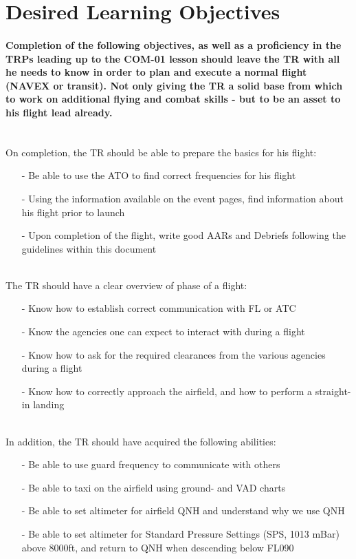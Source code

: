 \section*{Desired Learning Objectives}
 	\paragraph{
    		Completion of the following objectives, as well as a proficiency in the TRPs leading up to the COM-01 lesson should leave the TR with all he needs to know in order to plan and execute a normal flight (NAVEX or transit). Not only giving the TR a solid base from which to work on additional flying and combat skills - but to be an asset to his flight lead already. \\
    } 
    
  	\textnormal{\\ On completion, the TR should be able to prepare the basics for his flight:}
  	\begin{itemize}
  		\item[-] Be able to use the ATO to find correct frequencies for his flight
  		\item[-] Using the information available on the event pages, find information about his flight prior to launch
  		\item[-] Upon completion of the flight, write good AARs and Debriefs following the guidelines within this document
	\end{itemize}
    
	\textnormal{\\ The TR should have a clear overview of phase of a flight:}
  	\begin{itemize}
    	\item[-] Know how to establish correct communication with FL or ATC
    	\item[-] Know the agencies one can expect to interact with during a flight
    	\item[-] Know how to ask for the required clearances from the various agencies during a flight
        \item[-] Know how to correctly approach the airfield, and how to perform a straight-in landing
    \end{itemize}
    
    \textnormal{\\ In addition, the TR should have acquired the following abilities:}
  	\begin{itemize}
    	\item[-] Be able to use guard frequency to communicate with others
    	\item[-] Be able to taxi on the airfield using ground- and VAD charts
    	\item[-] Be able to set altimeter for airfield QNH and understand why we use QNH
        \item[-] Be able to set altimeter for Standard Pressure Settings (SPS, 1013 mBar) above 8000ft, and return to QNH when descending below FL090
    \end{itemize}